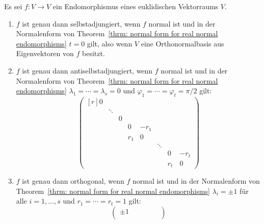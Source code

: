 \begin{proposition}
  Es sei $f \colon V \to V$ ein Endomorphismus eines euklidischen Vektorraums $V$.
  \begin{enumerate}[leftmargin=*, label=\roman*)]
    \item
      $f$ ist genau dann selbstadjungiert, wenn $f$ normal ist und in der Normalenform von Theorem~\ref{thrm: normal form for real normal endomorphisms} $t = 0$ gilt, also wenn $V$ eine Orthonormalbasis aus Eigenvektoren von $f$ besitzt.
    \item
      $f$ ist genau dann antiselbstadjungiert, wenn $f$ normal ist und in der Normalenform von Theorem~\ref{thrm: normal form for real normal endomorphisms} $\lambda_1 = \dotsb = \lambda_s = 0$ und $\varphi_1 = \dotsb = \varphi_t = \pi/2$ gilt:
      \[
        \begin{pmatrix*}[r]
          0 &         &   &                 &                   &         &                 &                   \\
            & \ddots  &   &                 &                   &         &                 &                   \\
            &         & 0 &                 &                   &         &                 &                   \\
            &         &   & 0_{\phantom{1}} & -r_1              &         &                 &                   \\
            &         &   & r_1             &  0_{\phantom{1}}  &         &                 &                   \\
            &         &   &                 &                   & \ddots  &                 &                   \\
            &         &   &                 &                   &         & 0_{\phantom{1}} & -r_t              \\
            &         &   &                 &                   &         & r_t             &  0_{\phantom{1}}
        \end{pmatrix*}
      \]
    \item
      $f$ ist genau dann orthogonal, wenn $f$ normal ist und in der Normalenform von Theorem~\ref{thrm: normal form for real normal endomorphisms} $\lambda_i = \pm 1$ für alle $i = 1, \dotsc, s$ und $r_1 = \dotsb = r_t = 1$ gilt:
      \[
        \begin{pmatrix}
          \pm 1 &         &       &               &         &               \\

\end{pmatrix}\]
\end{enumerate}
\end{proposition}
